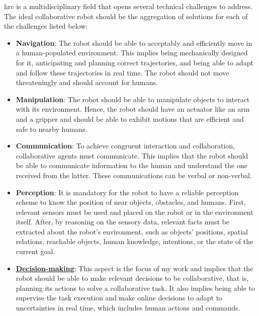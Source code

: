 \acrfull{hrc} is a multidisciplinary field that opens several technical challenges to address. The ideal collaborative robot should be the aggregation of solutions for each of the challenges listed below:

\begin{itemize}
    \item \textbf{Navigation}: The robot should be able to acceptably and efficiently move in a human-populated environment. This implies being mechanically designed for it, anticipating and planning correct trajectories, and being able to adapt and follow these trajectories in real time. The robot should not move threateningly and should account for humans.

    \item \textbf{Manipulation}: The robot should be able to manipulate objects to interact with its environment. Hence, the robot should have an actuator like an arm and a gripper and should be able to exhibit motions that are efficient and safe to nearby humans.

    \item \textbf{Communication}: To achieve congruent interaction and collaboration, collaborative agents must communicate. This implies that the robot should be able to communicate information to the human and understand the one received from the latter. These communications can be verbal or non-verbal.

    \item \textbf{Perception}: It is mandatory for the robot to have a reliable perception scheme to know the position of near objects, obstacles, and humans. First, relevant sensors must be used and placed on the robot or in the environment itself. After, by reasoning on the sensory data, relevant facts must be extracted about the robot's environment, such as objects' positions, spatial relations, reachable objects, human knowledge, intentions, or the state of the current goal. 
    
    \item \uline{\textbf{Decision-making}}: This aspect is the focus of my work and implies that the robot should be able to make relevant decisions to be collaborative, that is, planning its actions to solve a collaborative task. It also implies being able to supervise the task execution and make online decisions to adapt to uncertainties in real time, which includes human actions and commands. 

\end{itemize}
    
